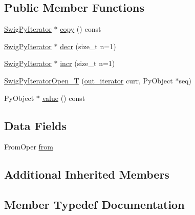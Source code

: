\subsection*{Public Member Functions}
\begin{DoxyCompactItemize}
\item 
\hyperlink{structswig_1_1_swig_py_iterator}{Swig\+Py\+Iterator} $\ast$ \hyperlink{classswig_1_1_swig_py_iterator_open___t_a98aa48ae93af61706ec3b587d2c7dda6}{copy} () const
\item 
\hyperlink{structswig_1_1_swig_py_iterator}{Swig\+Py\+Iterator} $\ast$ \hyperlink{classswig_1_1_swig_py_iterator_open___t_a5e556e6e84a3684129c79d38c171e976}{decr} (size\+\_\+t n=1)
\item 
\hyperlink{structswig_1_1_swig_py_iterator}{Swig\+Py\+Iterator} $\ast$ \hyperlink{classswig_1_1_swig_py_iterator_open___t_a6d7ddd4cc294d13214372f7619cb7ce5}{incr} (size\+\_\+t n=1)
\item 
\hyperlink{classswig_1_1_swig_py_iterator_open___t_aad68570a11be76ad2e4c5abbdca54b1e}{Swig\+Py\+Iterator\+Open\+\_\+T} (\hyperlink{classswig_1_1_swig_py_iterator___t_aec35545038c3d804975a147253f061e4}{out\+\_\+iterator} curr, Py\+Object $\ast$seq)
\item 
Py\+Object $\ast$ \hyperlink{classswig_1_1_swig_py_iterator_open___t_aa219f4e29ccea747d23fdb68705a530d}{value} () const
\end{DoxyCompactItemize}
\subsection*{Data Fields}
\begin{DoxyCompactItemize}
\item 
From\+Oper \hyperlink{classswig_1_1_swig_py_iterator_open___t_a1fdd8b3f85a163f2c5a0aa8bf4cb996d}{from}
\end{DoxyCompactItemize}
\subsection*{Additional Inherited Members}


\subsection{Member Typedef Documentation}
\mbox{\label{classswig_1_1_swig_py_iterator_open___t_acee28cc32d3d9a19f711bd9df933b06c}} 
